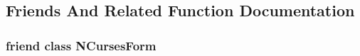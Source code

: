 \subsection{Friends And Related Function Documentation}
\hypertarget{class_n_curses_form_field_a4ce5a13a8b35977630ef1c99997ddb78}{
\subsubsection[{N\-Curses\-Form}]{\setlength{\rightskip}{0pt plus 5cm}friend class {\bf N\-Curses\-Form}\hspace{0.3cm}{\ttfamily [friend]}}}\label{class_n_curses_form_field_a4ce5a13a8b35977630ef1c99997ddb78}



